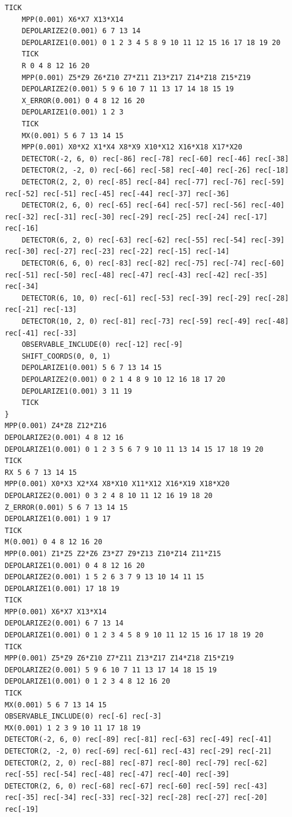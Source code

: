 \documentclass[onecolumn,unpublished,a4paper]{quantumarticle}
\theoremstyle{definition}
\theoremstyle{definition}
\theoremstyle{definition}
\begin{document}
\begin{lstlisting}[style=stimcircuit]
    TICK
    MPP(0.001) X6*X7 X13*X14
    DEPOLARIZE2(0.001) 6 7 13 14
    DEPOLARIZE1(0.001) 0 1 2 3 4 5 8 9 10 11 12 15 16 17 18 19 20
    TICK
    R 0 4 8 12 16 20
    MPP(0.001) Z5*Z9 Z6*Z10 Z7*Z11 Z13*Z17 Z14*Z18 Z15*Z19
    DEPOLARIZE2(0.001) 5 9 6 10 7 11 13 17 14 18 15 19
    X_ERROR(0.001) 0 4 8 12 16 20
    DEPOLARIZE1(0.001) 1 2 3
    TICK
    MX(0.001) 5 6 7 13 14 15
    MPP(0.001) X0*X2 X1*X4 X8*X9 X10*X12 X16*X18 X17*X20
    DETECTOR(-2, 6, 0) rec[-86] rec[-78] rec[-60] rec[-46] rec[-38]
    DETECTOR(2, -2, 0) rec[-66] rec[-58] rec[-40] rec[-26] rec[-18]
    DETECTOR(2, 2, 0) rec[-85] rec[-84] rec[-77] rec[-76] rec[-59] rec[-52] rec[-51] rec[-45] rec[-44] rec[-37] rec[-36]
    DETECTOR(2, 6, 0) rec[-65] rec[-64] rec[-57] rec[-56] rec[-40] rec[-32] rec[-31] rec[-30] rec[-29] rec[-25] rec[-24] rec[-17] rec[-16]
    DETECTOR(6, 2, 0) rec[-63] rec[-62] rec[-55] rec[-54] rec[-39] rec[-30] rec[-27] rec[-23] rec[-22] rec[-15] rec[-14]
    DETECTOR(6, 6, 0) rec[-83] rec[-82] rec[-75] rec[-74] rec[-60] rec[-51] rec[-50] rec[-48] rec[-47] rec[-43] rec[-42] rec[-35] rec[-34]
    DETECTOR(6, 10, 0) rec[-61] rec[-53] rec[-39] rec[-29] rec[-28] rec[-21] rec[-13]
    DETECTOR(10, 2, 0) rec[-81] rec[-73] rec[-59] rec[-49] rec[-48] rec[-41] rec[-33]
    OBSERVABLE_INCLUDE(0) rec[-12] rec[-9]
    SHIFT_COORDS(0, 0, 1)
    DEPOLARIZE1(0.001) 5 6 7 13 14 15
    DEPOLARIZE2(0.001) 0 2 1 4 8 9 10 12 16 18 17 20
    DEPOLARIZE1(0.001) 3 11 19
    TICK
}
MPP(0.001) Z4*Z8 Z12*Z16
DEPOLARIZE2(0.001) 4 8 12 16
DEPOLARIZE1(0.001) 0 1 2 3 5 6 7 9 10 11 13 14 15 17 18 19 20
TICK
RX 5 6 7 13 14 15
MPP(0.001) X0*X3 X2*X4 X8*X10 X11*X12 X16*X19 X18*X20
DEPOLARIZE2(0.001) 0 3 2 4 8 10 11 12 16 19 18 20
Z_ERROR(0.001) 5 6 7 13 14 15
DEPOLARIZE1(0.001) 1 9 17
TICK
M(0.001) 0 4 8 12 16 20
MPP(0.001) Z1*Z5 Z2*Z6 Z3*Z7 Z9*Z13 Z10*Z14 Z11*Z15
DEPOLARIZE1(0.001) 0 4 8 12 16 20
DEPOLARIZE2(0.001) 1 5 2 6 3 7 9 13 10 14 11 15
DEPOLARIZE1(0.001) 17 18 19
TICK
MPP(0.001) X6*X7 X13*X14
DEPOLARIZE2(0.001) 6 7 13 14
DEPOLARIZE1(0.001) 0 1 2 3 4 5 8 9 10 11 12 15 16 17 18 19 20
TICK
MPP(0.001) Z5*Z9 Z6*Z10 Z7*Z11 Z13*Z17 Z14*Z18 Z15*Z19
DEPOLARIZE2(0.001) 5 9 6 10 7 11 13 17 14 18 15 19
DEPOLARIZE1(0.001) 0 1 2 3 4 8 12 16 20
TICK
MX(0.001) 5 6 7 13 14 15
OBSERVABLE_INCLUDE(0) rec[-6] rec[-3]
MX(0.001) 1 2 3 9 10 11 17 18 19
DETECTOR(-2, 6, 0) rec[-89] rec[-81] rec[-63] rec[-49] rec[-41]
DETECTOR(2, -2, 0) rec[-69] rec[-61] rec[-43] rec[-29] rec[-21]
DETECTOR(2, 2, 0) rec[-88] rec[-87] rec[-80] rec[-79] rec[-62] rec[-55] rec[-54] rec[-48] rec[-47] rec[-40] rec[-39]
DETECTOR(2, 6, 0) rec[-68] rec[-67] rec[-60] rec[-59] rec[-43] rec[-35] rec[-34] rec[-33] rec[-32] rec[-28] rec[-27] rec[-20] rec[-19]

\end{lstlisting}
\end{document}

